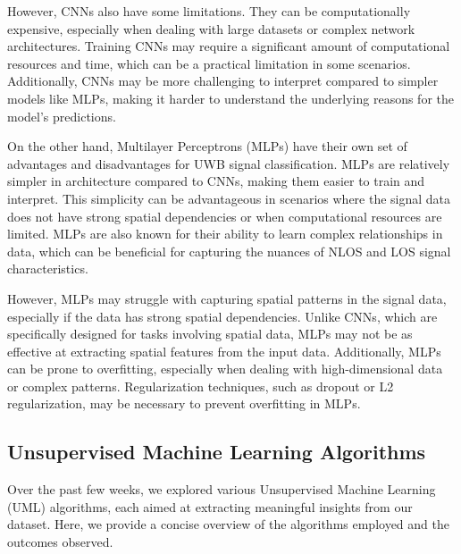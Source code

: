 However, CNNs also have some limitations. They can be computationally expensive, especially when dealing with large datasets or complex network architectures. Training CNNs may require a significant amount of computational resources and time, which can be a practical limitation in some scenarios. Additionally, CNNs may be more challenging to interpret compared to simpler models like MLPs, making it harder to understand the underlying reasons for the model's predictions.

On the other hand, Multilayer Perceptrons (MLPs) have their own set of advantages and disadvantages for UWB signal classification. MLPs are relatively simpler in architecture compared to CNNs, making them easier to train and interpret. This simplicity can be advantageous in scenarios where the signal data does not have strong spatial dependencies or when computational resources are limited. MLPs are also known for their ability to learn complex relationships in data, which can be beneficial for capturing the nuances of NLOS and LOS signal characteristics.

However, MLPs may struggle with capturing spatial patterns in the signal data, especially if the data has strong spatial dependencies. Unlike CNNs, which are specifically designed for tasks involving spatial data, MLPs may not be as effective at extracting spatial features from the input data. Additionally, MLPs can be prone to overfitting, especially when dealing with high-dimensional data or complex patterns. Regularization techniques, such as dropout or L2 regularization, may be necessary to prevent overfitting in MLPs.




\subsection{Unsupervised Machine Learning Algorithms}\label{uml}

Over the past few weeks, we explored various Unsupervised Machine Learning (UML) algorithms, each aimed at extracting meaningful insights from our dataset. Here, we provide a concise overview of the algorithms employed and the outcomes observed.

